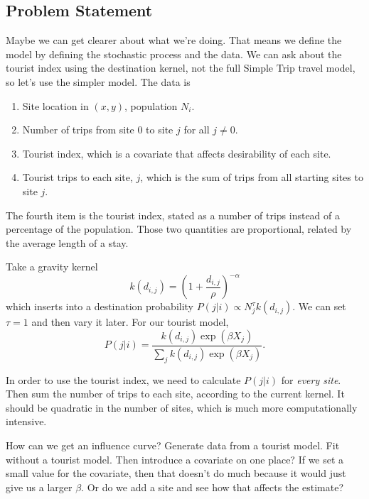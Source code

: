 \documentclass{article}
\begin{document}
\subsection{Problem Statement}

Maybe we can get clearer about what we're doing. That means we define the model by defining the stochastic process and the data. We can ask about the tourist index using the destination kernel, not the full Simple Trip travel model, so let's use the simpler model. The data is
\begin{enumerate}
  \item Site location in $(x,y)$, population $N_i$.
  \item Number of trips from site 0 to site $j$ for all $j\ne 0$.
  \item Tourist index, which is a covariate that affects desirability of each site.
  \item Tourist trips to each site, $j$, which is the sum of trips from all starting sites to site $j$.
  \end{enumerate}
The fourth item is the tourist index, stated as a number of trips instead of a percentage of the population. Those two quantities are proportional, related by the average length of a stay.

Take a gravity kernel
\begin{equation}
k(d_{i,j}) = \left(1+\frac{d_{i,j}}{\rho}\right)^{-\alpha}
\end{equation}
which inserts into a destination probability $P(j|i)\propto N_j^{\tau}k(d_{i,j})$. We can set $\tau=1$ and then vary it later. For our tourist model,
\begin{equation}
  P(j|i) = \frac{k(d_{i,j})\exp(\beta X_j)}{\sum_{j} k(d_{i,j})\exp(\beta X_j)}.
\end{equation}

In order to use the tourist index, we need to calculate $P(j|i)$ for \emph{every site}. Then sum the number of trips to each site, according to the current kernel. It should be quadratic in the number of sites, which is much more computationally intensive.

How can we get an influence curve? Generate data from a tourist model. Fit without a tourist model. Then introduce a covariate on one place? If we set a small value for the covariate, then that doesn't do much because it would just give us a larger $\beta$. Or do we add a site and see how that affects the estimate?




\end{document}
